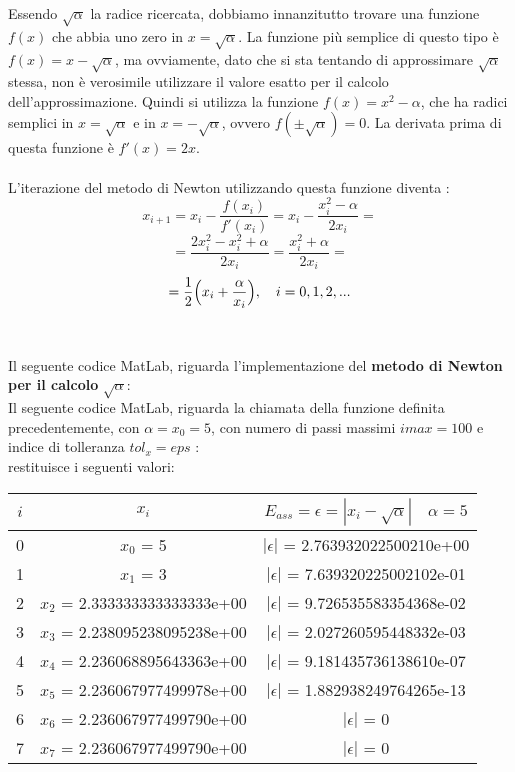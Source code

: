 Essendo $\sqrt{\alpha}$ la radice ricercata, dobbiamo innanzitutto trovare una funzione $f(x)$ che abbia uno zero in $x=\sqrt{\alpha}$. La funzione più semplice di questo tipo è $f(x)=x-\sqrt{\alpha}$, ma ovviamente, dato che si sta tentando di approssimare $\sqrt{\alpha}$ stessa, non è verosimile utilizzare il valore esatto per il calcolo dell'approssimazione. Quindi si
utilizza la funzione $f(x) = x^2-\alpha$, che ha radici semplici in $x=\sqrt{\alpha}$ e in $x=-\sqrt{\alpha}$, ovvero $f(\pm\sqrt{\alpha})=0$. La derivata prima di questa funzione è $f'(x)=2x$.\\\\
L'iterazione del metodo di Newton utilizzando questa funzione diventa :
	\[
	x_{i+1} = x_i-\frac{f(x_i)}{f'(x_i)} = x_i - \frac{x_i^2-\alpha}{2x_i} =
	\]
	\[
	= \frac{2x_i^2-x_i^2+\alpha}{2x_i} = \frac{x_i^2+\alpha}{2x_i} =
	\]
	\[
	= \frac{1}{2} \Bigl( x_i+\frac{\alpha}{x_i} \Bigl),\quad i=0,1,2,...
	\]\\\\
Il seguente codice MatLab, riguarda l'implementazione del \textbf{metodo di Newton per il calcolo} $\sqrt{\alpha}$:\\ 
	
Il seguente codice MatLab, riguarda la chiamata della funzione definita precedentemente, con $\alpha=x_0=5$, con numero di passi massimi $imax=100$ e indice di tolleranza $tol_x=eps$ :\\
	
restituisce i seguenti valori:\\
\begin{center}
	\begin{tabular}{|c|c|c|}
		\hline
			$i$ & $x_i$ & $E_{ass}=\epsilon=|x_i-\sqrt{\alpha}| \quad \alpha=5$ \\
		\hline
    		0 & $x_0$ = 5 & $|\epsilon|$ = 2.763932022500210e+00\\
    		1 & $x_1$ = 3 & $|\epsilon|$ = 7.639320225002102e-01\\
    		2 & $x_2$ = 2.333333333333333e+00 & $|\epsilon|$ = 9.726535583354368e-02\\
    		3 & $x_3$ = 2.238095238095238e+00 & $|\epsilon|$ = 2.027260595448332e-03\\
    		4 & $x_4$ = 2.236068895643363e+00 & $|\epsilon|$ = 9.181435736138610e-07\\
    		5 & $x_5$ = 2.236067977499978e+00 & $|\epsilon|$ = 1.882938249764265e-13\\
    		6 & $x_6$ = 2.236067977499790e+00 & $|\epsilon|$ = 0\\
    		7 & $x_7$ = 2.236067977499790e+00 & $|\epsilon|$ = 0\\
		\hline
	\end{tabular}
\end{center}